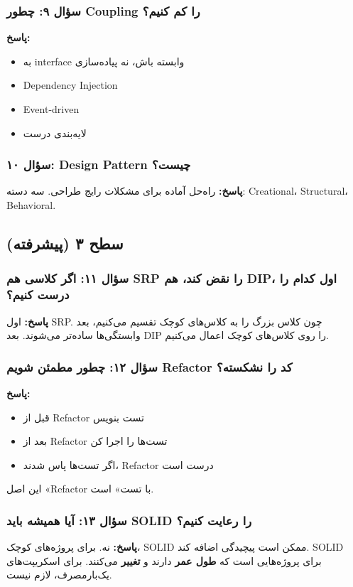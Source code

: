 \documentclass[12pt, a4paper]{article}
\begin{document}
\subsubsection{سؤال ۹: چطور Coupling را کم کنیم؟}
\textbf{پاسخ:}
\begin{itemize}
    \item به interface وابسته باش، نه پیاده‌سازی
    \item Dependency Injection
    \item Event-driven
    \item لایه‌بندی درست
\end{itemize}

\subsubsection{سؤال ۱۰: Design Pattern چیست؟}
\textbf{پاسخ:} راه‌حل آماده برای مشکلات رایج طراحی. سه دسته: Creational، 
Structural، Behavioral.

\subsection{سطح ۳ (پیشرفته)}

\subsubsection{سؤال ۱۱: اگر کلاسی هم SRP را نقض کند، هم DIP، اول کدام را 
درست کنیم؟}
\textbf{پاسخ:} اول SRP. چون کلاس بزرگ را به کلاس‌های کوچک تقسیم می‌کنیم، بعد 
وابستگی‌ها ساده‌تر می‌شوند. بعد DIP را روی کلاس‌های کوچک اعمال می‌کنیم.

\subsubsection{سؤال ۱۲: چطور مطمئن شویم Refactor کد را نشکسته؟}
\textbf{پاسخ:}
\begin{itemize}
    \item قبل از Refactor تست بنویس
    \item بعد از Refactor تست‌ها را اجرا کن
    \item اگر تست‌ها پاس شدند، Refactor درست است
\end{itemize}
این اصل «Refactor با تست» است.

\subsubsection{سؤال ۱۳: آیا همیشه باید SOLID را رعایت کنیم؟}
\textbf{پاسخ:} نه. برای پروژه‌های کوچک، SOLID ممکن است پیچیدگی اضافه کند. 
SOLID برای پروژه‌هایی است که \textbf{طول عمر} دارند و \textbf{تغییر} 
می‌کنند. برای اسکریپت‌های یک‌بارمصرف، لازم نیست.
\end{document}
